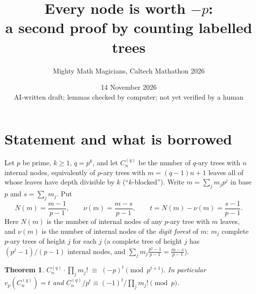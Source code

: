\documentclass[11pt]{article}
\title{Every node is worth $-p$:\\ a second proof by counting labelled trees}
\author{Mighty Math Magicians, Caltech Mathathon 2026}
\date{14 November 2026\\\small AI-written draft; lemmas checked by computer; not yet verified by a human}
\newtheorem{theorem}{Theorem}
\theoremstyle{remark}
\newcommand{\C}{C_n^{(q)}}
\begin{document}
\maketitle

\noindent{}

\section{Statement and what is borrowed}

Let $p$ be prime, $k\ge1$, $q=p^k$, and let $\C$ be the number of $q$-ary trees with $n$
internal nodes, equivalently of $p$-ary trees with $m=(q-1)n+1$ leaves all of whose leaves have
depth divisible by $k$ (``$k$-blocked''). Write $m=\sum_j m_jp^j$ in base $p$ and
$s=\sum_j m_j$. Put
\[
 N(m)=\frac{m-1}{p-1},\qquad \nu(m)=\frac{m-s}{p-1},\qquad t=N(m)-\nu(m)=\frac{s-1}{p-1}.
\]
Here $N(m)$ is the number of internal nodes of any $p$-ary tree with $m$ leaves, and $\nu(m)$
is the number of internal nodes of the \emph{digit forest} of $m$: $m_j$ complete $p$-ary
trees of height $j$ for each $j$ (a complete tree of height $j$ has $(p^j-1)/(p-1)$ internal
nodes, and $\sum_j m_j\frac{p^j-1}{p-1}=\frac{m-s}{p-1}$).

\begin{theorem}\label{thm}
$\displaystyle \C\cdot\prod_j m_j!\;\equiv\;(-p)^{t}\pmod{p^{t+1}}.$
In particular $v_p(\C)=t$ and $\C/p^t\equiv(-1)^t/\prod_jm_j!\pmod p$.
\end{theorem}
\end{document}
